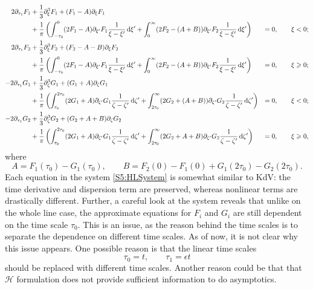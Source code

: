 \documentclass[11pt,reqno,oneside,a4paper]{article}
\begin{document}
\begin{equation}\label{S5:HLSystem}
\begin{aligned}
2 \partial_{\tau_1}F_1 &+ \frac{1}{3} \partial_\xi^3 F_1 + (F_1-A)\partial_\xi F_1 \\
&+ \frac{1}{\pi} \left(\int^0_{-\tau_0} (2 F_1  - A)\partial_{\xi'} F_1\frac{1}{\xi -\xi'} \,\mathrm{d} \xi' + \int^{\infty}_{0} (2 F_2 - (A+B))\partial_{\xi'} F_2 \frac{1}{\xi -\xi'} \,\mathrm{d} \xi'\right)  &= 0, \qquad \xi < 0; \\
2 \partial_{\tau_1}F_2 &+ \frac{1}{3} \partial_\xi^3 F_2 + (F_2-A-B)\partial_\xi F_2 \\
&+ \frac{1}{\pi}  \left( \int^0_{-\tau_0} (2 F_1 -A)\partial_{\xi'}F_1\frac{1}{\xi -\xi'} \,\mathrm{d} \xi' + \int^{\infty}_{0} (2 F_2 -  (A+B))\partial_{\xi'} F_2 \frac{1}{\xi -\xi'} \,\mathrm{d} \xi'  \right) &= 0, \qquad \xi \geqslant 0; \\
- 2 \partial_{\tau_1} G_1 &+  \frac{1}{3} \partial_\zeta^3 G_1 + (G_1+A) \partial_{\zeta} G_1 \\
&+  \frac{1}{\pi} \left( \int^{2\tau_0}_{\tau_0} (2 G_1 + A) \partial_{\zeta'} G_1 \frac{1}{\zeta -\zeta'} \,\mathrm{d} \zeta' + \int^{\infty}_{2\tau_0} (2 G_2+(A+B)) \partial_{\zeta'} G_2 \frac{1}{\zeta -\zeta'} \,\mathrm{d} \zeta' \right) &= 0, \qquad \xi < 0; \\
- 2 \partial_{\tau_1} G_2 &+  \frac{1}{3} \partial_\zeta^3 G_2 + (G_2+ A +B)\partial_{\zeta} G_2 \\
&+ \frac{1}{\pi}  \left( \int^{2\tau_0}_{\tau_0} (2 G_1 +A)\partial_{\zeta'} G_1 \frac{1}{\zeta -\zeta'} \,\mathrm{d} \zeta' + \int^{\infty}_{2\tau_0} (2 G_2+A+B) \partial_{\zeta'} G_2 \frac{1}{\zeta -\zeta'} \,\mathrm{d} \zeta' \right) &= 0, \qquad \xi \geqslant 0,
\end{aligned}
\end{equation}
where 
\[ A = F_1(\tau_0)  - G_1(\tau_0), \qquad B = F_2(0) - F_1(0)  +  G_1(2\tau_0) - G_2(2\tau_0). \]
Each equation in the system \eqref{S5:HLSystem} is somewhat similar to KdV: the time derivative and dispersion term are preserved, whereas nonlinear terms are drastically different. Further, a careful look at the system reveals that unlike on the whole line case, the approximate equations for $F_i$ and $G_i$ are still dependent on the time scale $\tau_0.$ This is an issue, as the reason behind the time scales is to separate the dependence on different time scales. As of now, it is not clear why this issue appears. One possible reason is that the linear time scales
\[ \tau_0 = t, \qquad \tau_1 = \epsilon t\]
should be replaced with different time scales. Another reason could be that that $\mathcal{H}$ formulation does not provide sufficient information to do asymptotics.   
\end{document}
